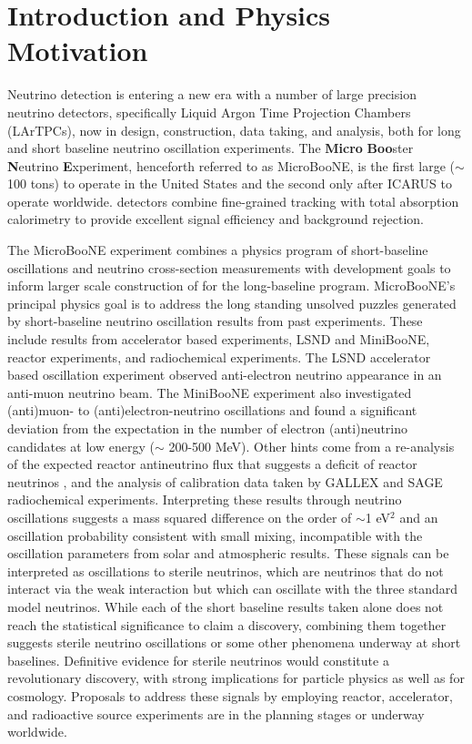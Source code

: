 \section{Introduction and Physics Motivation}

Neutrino detection is entering a new era with a number of large precision neutrino detectors, specifically Liquid Argon Time Projection Chambers (LArTPCs), now in design, construction, data taking, and analysis, both for long and short baseline neutrino oscillation experiments.  The {\bf{Micro}} {\bf{Boo}}ster {\bf{N}}eutrino {\bf{E}}xperiment, henceforth referred to as MicroBooNE, is the first large ($\sim$100 tons) \lartpc to operate in the United States and the second only after ICARUS to operate worldwide.  \lartpc detectors combine fine-grained tracking with total absorption calorimetry to provide excellent signal efficiency and background rejection.  

The MicroBooNE experiment combines a physics program of short-baseline oscillations and neutrino cross-section measurements with development goals to inform larger scale construction of \lartpcs for the long-baseline program.  MicroBooNE's principal physics goal is to address the long standing unsolved puzzles generated by short-baseline neutrino oscillation results from past experiments. These include results from accelerator based experiments, LSND and MiniBooNE, reactor experiments, and radiochemical experiments.  The LSND accelerator based oscillation experiment observed  anti-electron neutrino appearance in an anti-muon neutrino beam.  The MiniBooNE experiment \cite{AguilarArevalo:2008rc} also investigated (anti)muon- to (anti)electron-neutrino oscillations and found a significant deviation from the expectation in the number of electron (anti)neutrino candidates at low energy ($\sim$ 200-500 MeV).  Other hints come from a re-analysis of the expected reactor antineutrino flux that suggests a deficit of reactor neutrinos \cite{PhysRevC.83.054615,PhysRevC.84.024617}, and the analysis of calibration data taken by GALLEX and SAGE \cite{Hampel:1997fc,Abdurashitov:1998ne} radiochemical experiments.   Interpreting these results through neutrino oscillations suggests a mass squared difference on the order of $\sim$1 eV$^2$ and an oscillation probability consistent with small mixing, incompatible with the oscillation parameters from solar and atmospheric results.  These signals can be interpreted as oscillations to sterile neutrinos, which are neutrinos that do not interact via the weak interaction but which can oscillate with the three standard model neutrinos.  While each of the short baseline results taken alone does not reach the statistical significance to claim a discovery, combining them together suggests sterile neutrino oscillations or some other phenomena underway at short baselines.   Definitive evidence for sterile neutrinos would constitute a revolutionary discovery, with strong implications for particle physics as well as for cosmology. Proposals to address these signals by employing reactor, accelerator, and radioactive source experiments are in the planning stages or underway worldwide.
   
